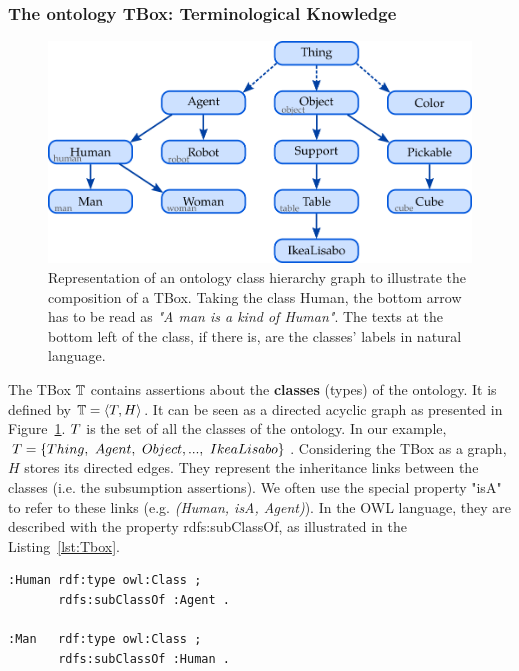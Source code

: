 \subsubsection{The ontology TBox: Terminological Knowledge}

\begin{figure}[h!]
\centering
\includegraphics[scale=0.4]{figures/chapter2/Tbox.png}
\caption{\label{fig:Tbox} Representation of an ontology class hierarchy graph to illustrate the composition of a TBox. Taking the class Human, the bottom arrow has to be read as \textit{"A man is a kind of Human"}. The texts at the bottom left of the class, if there is, are the classes' labels in natural language.}
\end{figure}

The TBox $\mathbb{T}$ contains assertions about the \textbf{classes} (types) of the ontology. It is defined by $\mathbb{T} = \langle T, H \rangle$. It can be seen as a directed acyclic graph as presented in Figure~\ref{fig:Tbox}. $T$ is the set of all the classes of the ontology. In our example, $T = \{Thing,\ Agent,\ Object, ...,\ IkeaLisabo\}$. Considering the TBox as a graph, $H$ stores its directed edges. They represent the inheritance links between the classes (i.e. the subsumption assertions). We often use the special property "isA" to refer to these links (e.g. \textit{(Human, isA, Agent)}). In the OWL language, they are described with the property rdfs:subClassOf, as illustrated in the Listing~\ref{lst:Tbox}.

\begin{minipage}{\textwidth}
\begin{lstlisting}[frame=single, basicstyle=\scriptsize\ttfamily, label={lst:Tbox}, caption={Description of ontology classes in the OWL language using the Turle syntax.},captionpos=b, style=OwlTurtle]
:Human rdf:type owl:Class ;
       rdfs:subClassOf :Agent .

:Man   rdf:type owl:Class ;
       rdfs:subClassOf :Human .
\end{lstlisting}
\end{minipage}

